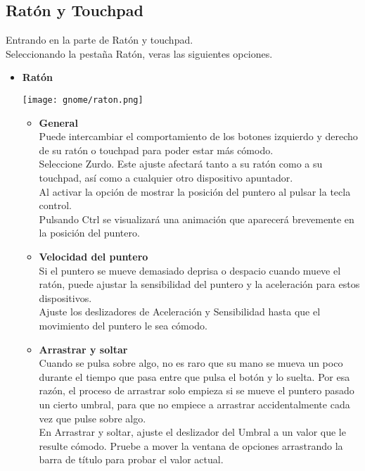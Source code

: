 \subsection{Ratón y Touchpad}
Entrando en la parte de Ratón y touchpad. \\
Seleccionando la pestaña Ratón, veras las siguientes opciones.
\begin{itemize}
\item{\large \bf Ratón}\\
\begin{center}
\texttt{[image: gnome/raton.png]} 
\end{center}
\begin{itemize}
\item{\bf General}\\
Puede intercambiar el comportamiento de los botones izquierdo y derecho de su ratón o touchpad para poder estar más cómodo.\\
Seleccione Zurdo.
Este ajuste afectará tanto a su ratón como a su touchpad, así como a cualquier otro dispositivo apuntador.\\

Al activar la opción de mostrar la posición del puntero al pulsar la tecla control.\\
Pulsando Ctrl se visualizará una animación que aparecerá brevemente en la posición del puntero.
\item{\bf Velocidad del puntero}\\
Si el puntero se mueve demasiado deprisa o despacio cuando mueve el ratón, puede ajustar la sensibilidad del puntero y la aceleración para estos dispositivos.\\

Ajuste los deslizadores de Aceleración y Sensibilidad hasta que el movimiento del puntero le sea cómodo.
\item{\bf Arrastrar y soltar}\\
Cuando se pulsa sobre algo, no es raro que su mano se mueva un poco durante el tiempo que pasa entre que pulsa el botón y lo suelta. Por esa razón, el proceso de arrastrar solo empieza si se mueve el puntero pasado un cierto umbral, para que no empiece a arrastrar accidentalmente cada vez que pulse sobre algo.\\

En Arrastrar y soltar, ajuste el deslizador del Umbral a un valor que le resulte cómodo. Pruebe a mover la ventana de opciones arrastrando la barra de título para probar el valor actual.\\


\end{itemize}
\end{itemize}
